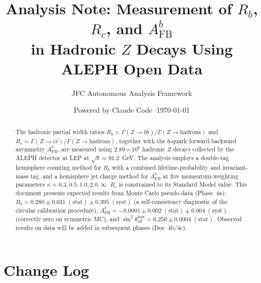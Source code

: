 \documentclass[11pt,a4paper]{article}
\title{Analysis Note: Measurement of $R_b$, $R_c$, and $A_\mathrm{FB}^b$\\
in Hadronic $Z$ Decays Using ALEPH Open Data}
\author{JFC Autonomous Analysis Framework}
\date{Powered by Claude Code \quad$\cdot$\quad \today}
\begin{document}
\maketitle

\begin{abstract}
The hadronic partial width ratios $R_b = \Gamma(Z \to b\bar{b})/\Gamma(Z \to \mathrm{hadrons})$
and $R_c = \Gamma(Z \to c\bar{c})/\Gamma(Z \to \mathrm{hadrons})$, together with the
$b$-quark forward-backward asymmetry $A_\mathrm{FB}^b$, are measured using $2.89 \times 10^6$
hadronic $Z$ decays collected by the ALEPH detector at LEP at $\sqrt{s} \approx 91.2$~GeV.
The analysis employs a double-tag hemisphere counting method for $R_b$ with a combined
lifetime-probability and invariant-mass tag, and a hemisphere jet charge method for
$A_\mathrm{FB}^b$ at five momentum-weighting parameters $\kappa = 0.3, 0.5, 1.0, 2.0, \infty$.
$R_c$ is constrained to its Standard Model value.
This document presents expected results from Monte Carlo pseudo-data (Phase~4a):
$R_b = 0.280 \pm 0.031\;\mathrm{(stat)} \pm 0.395\;\mathrm{(syst)}$
(a self-consistency diagnostic of the circular calibration procedure),
$A_\mathrm{FB}^b = -0.0001 \pm 0.002\;\mathrm{(stat)} \pm 0.004\;\mathrm{(syst)}$
(correctly zero on symmetric MC), and
$\sin^2\theta_\mathrm{eff}^\mathrm{lept} = 0.250 \pm 0.0004\;\mathrm{(stat)}$.
Observed results on data will be added in subsequent phases (Doc~4b/4c).
\end{abstract}

\tableofcontents
\clearpage

\section*{Change Log}
\end{document}
